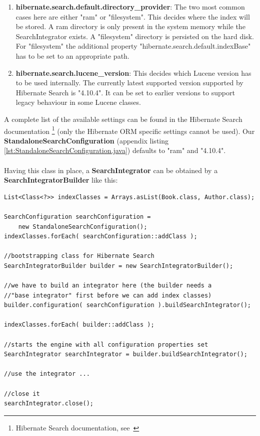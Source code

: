 \begin{enumerate}
	\item \textbf{hibernate.search.default.directory\_provider}: The two most common cases here are either "ram" or "filesystem". This decides where the index will be stored. A ram directory is only present in the system memory while the SearchIntegrator exists. A "filesystem" directory is persisted on the hard disk. For "filesystem" the additional property "hibernate.search.default.indexBase" has to be set to an appropriate path.
	
	\item \textbf{hibernate.search.lucene\_version}: This decides which Lucene version has to be used internally. The currently latest supported version supported by Hibernate Search is "4.10.4". It can be set to earlier versions to support legacy behaviour in some Lucene classes.
\end{enumerate}
\noindent
A complete list of the available settings can be found in the Hibernate Search documentation \footnote{Hibernate Search documentation, see~\cite{hibernate_search_doc}} (only the Hibernate ORM specific settings cannot be used). Our \textbf{StandaloneSearchConfiguration} (appendix listing \ref{lst:StandaloneSearchConfiguration.java}) defaults to "ram" and "4.10.4".
\\\\
Having this class in place, a \textbf{SearchIntegrator} can be obtained by a \textbf{SearchIntegratorBuilder} like this:
\\
\lstset{language=java}
\begin{lstlisting}[frame=htrbl, caption={Starting up the engine}, label={lst:starting_up_engine.java}]
List<Class<?>> indexClasses = Arrays.asList(Book.class, Author.class);

SearchConfiguration searchConfiguration = 
	new StandaloneSearchConfiguration();
indexClasses.forEach( searchConfiguration::addClass );

//bootstrapping class for Hibernate Search
SearchIntegratorBuilder builder = new SearchIntegratorBuilder();

//we have to build an integrator here (the builder needs a 
//"base integrator" first before we can add index classes)
builder.configuration( searchConfiguration ).buildSearchIntegrator();

indexClasses.forEach( builder::addClass );

//starts the engine with all configuration properties set
SearchIntegrator searchIntegrator = builder.buildSearchIntegrator();

//use the integrator ...

//close it
searchIntegrator.close();
\end{lstlisting}

